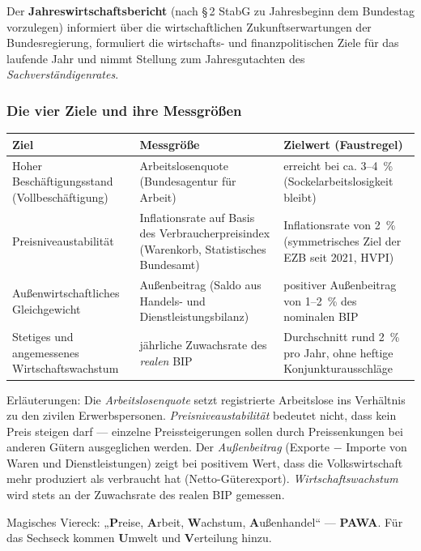 \documentclass[11pt, a4paper]{article}
\begin{document}
Der \textbf{Jahreswirtschaftsbericht} (nach \S\,2 StabG zu Jahresbeginn dem Bundestag
vorzulegen) informiert über die wirtschaftlichen Zukunftserwartungen der Bundesregierung,
formuliert die wirtschafts- und finanzpolitischen Ziele für das laufende Jahr und nimmt
Stellung zum Jahresgutachten des \emph{Sachverständigenrates}.

\subsubsection{Die vier Ziele und ihre Messgrößen}

\begin{center}
\begin{tabular}{p{4.2cm} p{4.6cm} p{5.4cm}}
\toprule
\textbf{Ziel} & \textbf{Messgröße} & \textbf{Zielwert (Faustregel)}\\
\midrule
Hoher Beschäftigungsstand (Vollbeschäftigung) & Arbeitslosenquote (Bundesagentur für Arbeit) & erreicht bei ca. 3--4~\% (Sockelarbeitslosigkeit bleibt)\\
Preisniveaustabilität & Inflationsrate auf Basis des Verbraucherpreisindex (Warenkorb, Statistisches Bundesamt) & Inflationsrate von 2~\% (symmetrisches Ziel der EZB seit 2021, HVPI)\\
Außenwirtschaftliches Gleichgewicht & Außenbeitrag (Saldo aus Handels- und Dienstleistungsbilanz) & positiver Außenbeitrag von 1--2~\% des nominalen BIP\\
Stetiges und angemessenes Wirtschaftswachstum & jährliche Zuwachsrate des \emph{realen} BIP & Durchschnitt rund 2~\% pro Jahr, ohne heftige Konjunkturausschläge\\
\bottomrule
\end{tabular}
\end{center}

Erläuterungen: Die \emph{Arbeitslosenquote} setzt registrierte Arbeitslose ins Verhältnis
zu den zivilen Erwerbspersonen. \emph{Preisniveaustabilität} bedeutet nicht, dass kein
Preis steigen darf --- einzelne Preissteigerungen sollen durch Preissenkungen bei anderen
Gütern ausgeglichen werden. Der \emph{Außenbeitrag} (Exporte $-$ Importe von Waren und
Dienstleistungen) zeigt bei positivem Wert, dass die Volkswirtschaft mehr produziert als
verbraucht hat (Netto-Güterexport). \emph{Wirtschaftswachstum} wird stets an der
Zuwachsrate des realen BIP gemessen.

\begin{eselsbruecke}
Magisches Viereck: „\textbf{P}reise, \textbf{A}rbeit, \textbf{W}achstum,
\textbf{A}ußenhandel`` --- \textbf{PAWA}. Für das Sechseck kommen \textbf{U}mwelt und
\textbf{V}erteilung hinzu.
\end{eselsbruecke}
\end{document}
